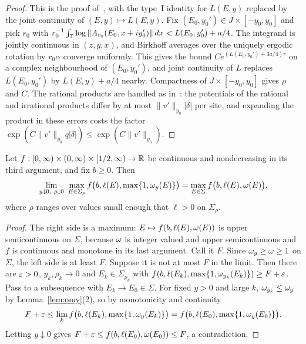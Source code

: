 \begin{proof}
This is the proof of~\cite[Lemma~5.5(2)]{DMuniv}, with the type~I identity for $L(E,y)$ replaced by the joint continuity of $(E,y)\mapsto L(E,y)$. Fix $(E_0,y_0')\in J\times[-y_0,y_0]$ and pick $r_0$ with $r_0^{-1}\int_\mathbb T\log\|A_{r_0}(E_0,x+iy_0')\|\,dx<L(E_0,y_0')+a/4$. The integrand is jointly continuous in $(z,y,x)$, and Birkhoff averages over the uniquely ergodic rotation by $r_0\alpha$ converge uniformly. This gives the bound $Ce^{(L(E_0,y_0')+3a/4)r}$ on a complex neighbourhood of $(E_0,y_0')$, and joint continuity of $L$ replaces $L(E_0,y_0')$ by $L(E,y)+a/4$ nearby. Compactness of $J\times[-y_0,y_0]$ gives $\rho$ and $C$. The rational products are handled as in~\cite[Lemma~5.5(3)]{DMuniv}: the potentials of the rational and irrational products differ by at most $\|v'\|_{y_0}|\delta|$ per site, and expanding the product in these errors costs the factor $\exp(C\|v'\|_{y_0}q|\delta|)\le\exp(C\|v'\|_{y_0})$.
\end{proof}

\begin{lemma}\label{lem:monolimit}
Let $f:[0,\infty)\times(0,\infty)\times[1/2,\infty)\to\mathbb R$ be continuous and nondecreasing in its third argument, and fix $b\ge0$. Then
\[
\lim_{y\downarrow0,\ \rho\downarrow0}\ \max_{E\in\Sigma_\rho}f\bigl(b,\ell(E),\max\{1,\om_y(E)\}\bigr)=\max_{E\in\Sigma}f\bigl(b,\ell(E),\om(E)\bigr),
\]
where $\rho$ ranges over values small enough that $\ell>0$ on $\Sigma_\rho$.
\end{lemma}

\begin{proof}
The right side is a maximum: $E\mapsto f(b,\ell(E),\omega(E))$ is upper semicontinuous on $\Sigma$, because $\omega$ is integer valued and upper semicontinuous and $f$ is continuous and monotone in its last argument. Call it $F$. Since $\omega_y\ge\omega\ge1$ on $\Sigma$, the left side is at least $F$. Suppose it is not at most $F$ in the limit. Then there are $\varepsilon>0$, $y_k,\rho_k\to0$ and $E_k\in\Sigma_{\rho_k}$ with $f(b,\ell(E_k),\max\{1,\omega_{y_k}(E_k)\})\ge F+\varepsilon$. Pass to a subsequence with $E_k\to E_0\in\Sigma$. For fixed $y>0$ and large $k$, $\omega_{y_k}\le\omega_y$ by Lemma~\ref{lem:omy}(2), so by monotonicity and continuity
\[
F+\varepsilon\le\lim_kf\bigl(b,\ell(E_k),\max\{1,\omega_y(E_k)\}\bigr)=f\bigl(b,\ell(E_0),\max\{1,\omega_y(E_0)\}\bigr).
\]
Letting $y\downarrow0$ gives $F+\varepsilon\le f(b,\ell(E_0),\omega(E_0))\le F$, a contradiction.
\end{proof}

